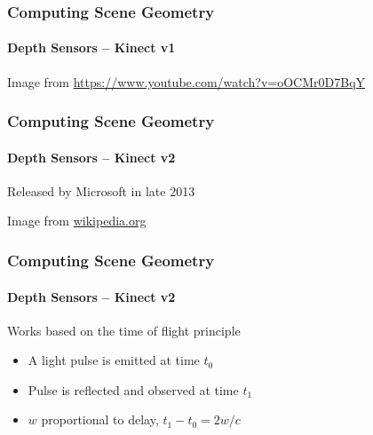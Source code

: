 \documentclass[xetex,professionalfont]{beamer}
\begin{document}
\begin{frame}
\frametitle{Computing Scene Geometry}
\framesubtitle{Depth Sensors -- Kinect v1}

\begin{center}
    {\centering Image from \url{https://www.youtube.com/watch?v=oOCMr0D7BqY}}
\end{center}

\end{frame}


\begin{frame}
\frametitle{Computing Scene Geometry}
\framesubtitle{Depth Sensors -- Kinect v2}

Released by Microsoft in late 2013

\begin{center}
    {\centering Image from \url{wikipedia.org}}
\end{center}

\end{frame}


\begin{frame}
\frametitle{Computing Scene Geometry}
\framesubtitle{Depth Sensors -- Kinect v2}

Works based on the time of flight principle
\begin{itemize}
    \item A light pulse is emitted at time $t_0$
    \item Pulse is reflected and observed at time $t_1$
    \item $w$ proportional to delay, $t_1-t_0=2w/c$ %
\end{itemize}


\end{frame}
\end{document}
